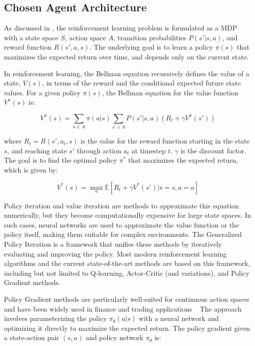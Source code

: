 \documentclass[11pt]{article}
\begin{document}
    \subsection{Chosen Agent Architecture}
    \label{subsec:agent}

    As discussed in , the reinforcement learning problem is formulated as a MDP with a state space \( S \),
    action space \( A \), transition probabilities \( P(s'|s, a) \), and reward function \( R(s', a, s) \).
    The underlying goal is to learn a policy \( \pi(s) \) that maximizes the expected return over time,
    and depends only on the current state.

    In reinforcement learning, the Bellman equation recursively defines the value of a state, \( V(s) \),
    in terms of the reward and the conditional expected future state values.
    For a given policy \( \pi(s) \), the Bellman equation for the value function \( V^{\pi}(s) \) is:

    \[
        V^{\pi}(s) = \sum_{a \in A} \pi(a|s) \sum_{s' \in S} P(s'|s, a) \left( R_t + \gamma V^{\pi}(s') \right)
    \]

    where \( R_t = R(s', a_t, s)\) is the value for the reward function starting in the state $s$, and reaching state $s'$ through
    action $a_t$ at timestep $t$. \( \gamma \) is the discount factor.
    The goal is to find the optimal policy \( \pi^* \) that maximizes the expected return, which is given by:

    \[
        V^*(s) = \max_a \mathbb{E}[R_t + \gamma V^*(s') | s = s, a = a]
    \]

    Policy iteration and value iteration are methods to approximate this equation numerically,
    but they become computationally expensive for large state spaces.
    In such cases, neural networks are used to approximate the value function or the policy itself, making them suitable for complex environments.
    The Generalized Policy Iteration is a framework that unifies these methods by iteratively evaluating and improving the policy.
    Most modern reinforcement learning algorithms and the current state-of-the-art methods are based on this framework,
    including but not limited to Q-learning, Actor-Critic (and variations), and Policy Gradient methods.

    Policy Gradient methods are particularly well-suited for continuous action spaces and have been widely used in finance and trading applications
    ~\citep{Guo2023, Gasperov2022}
    The approach involves parameterizing the policy \( \pi_\theta(a|s) \) with a neural network and optimizing it directly to maximize the expected return.
    The policy gradient given a state-action pair \( (s, a) \) and policy network \( \pi_\theta \) is:
\end{document}
